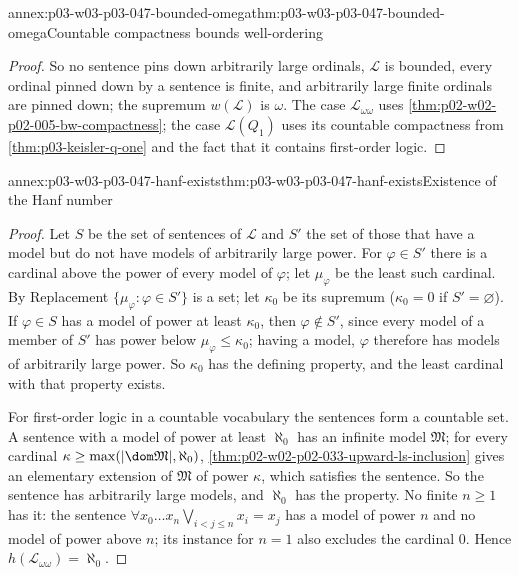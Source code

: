 \begin{annexitem}{annex:p03-w03-p03-047-bounded-omega}{thm:p03-w03-p03-047-bounded-omega}{Countable compactness bounds well-ordering}
\begin{proof}
So no sentence pins down arbitrarily large ordinals, \(\mathscr L\) is
bounded, every ordinal pinned down by a sentence is finite, and arbitrarily
large finite ordinals are pinned down; the supremum \(w(\mathscr L)\) is
\(\omega\).  The case \(\mathscr L_{\omega\omega}\) uses
\cref{thm:p02-w02-p02-005-bw-compactness}; the case \(\mathscr L(Q_1)\) uses its
countable compactness from \cref{thm:p03-keisler-q-one} and the fact that it
contains first-order logic.
\end{proof}
\end{annexitem}

\begin{annexitem}{annex:p03-w03-p03-047-hanf-exists}{thm:p03-w03-p03-047-hanf-exists}{Existence of the Hanf number}
\begin{proof}
Let \(S\) be the set of sentences of \(\mathscr L\) and \(S'\) the set of
those that have a model but do not have models of arbitrarily large power.
For \(\varphi\in S'\) there is a cardinal above the power of every model of
\(\varphi\); let \(\mu_\varphi\) be the least such cardinal.  By Replacement
\(\{\mu_\varphi:\varphi\in S'\}\) is a set; let \(\kappa_0\) be its supremum
(\(\kappa_0=0\) if \(S'=\varnothing\)).  If \(\varphi\in S\) has a model of
power at least \(\kappa_0\), then \(\varphi\notin S'\), since every model of
a member of \(S'\) has power below \(\mu_\varphi\le\kappa_0\); having a model,
\(\varphi\) therefore has models of arbitrarily large power.  So \(\kappa_0\)
has the defining property, and the least cardinal with that property exists.

For first-order logic in a countable vocabulary the sentences form a
countable set.  A sentence with a model of power at least \(\aleph_0\) has
an infinite model \(\mathfrak M\); for every cardinal
\(\kappa\ge\max(\lvert\dom\mathfrak M\rvert,\aleph_0)\),
\cref{thm:p02-w02-p02-033-upward-ls-inclusion} gives an elementary
extension of \(\mathfrak M\) of power \(\kappa\), which satisfies the
sentence.  So the sentence has arbitrarily large models, and \(\aleph_0\)
has the property.  No finite \(n\ge1\)
has it: the sentence \(\forall x_0\ldots x_n\bigvee_{i<j\le n}x_i=x_j\) has a
model of power \(n\) and no model of power above \(n\); its instance for
\(n=1\) also excludes the cardinal \(0\).  Hence
\(h(\mathscr L_{\omega\omega})=\aleph_0\).
\end{proof}
\end{annexitem}

